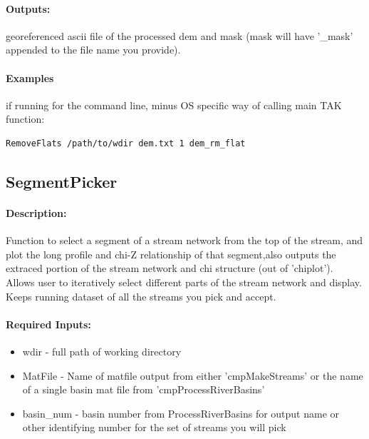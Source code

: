 \paragraph{Outputs:}
georeferenced ascii file of the processed dem and mask (mask will have '\_mask' appended to the
file name you provide).

\paragraph{Examples} if running for the command line, minus OS specific way of calling main TAK function:
\begin{lstlisting}[language=bash]
RemoveFlats /path/to/wdir dem.txt 1 dem_rm_flat
\end{lstlisting}

\subsection{SegmentPicker}
\paragraph{Description:}
Function to select a segment of a stream network from the top of the stream, and plot the long profile 
and chi-Z relationship of that segment,also outputs the extraced portion of the stream network and chi structure 
(out of 'chiplot'). Allows user to iteratively select different parts of the stream network and display. 
Keeps running dataset of all the streams you pick and accept.

\paragraph{Required Inputs:}
\begin{itemize}
\item wdir - full path of working directory
\item MatFile - Name of matfile output from either 'cmpMakeStreams' or the name of a single basin mat file from 'cmpProcessRiverBasins'
\item basin\_num - basin number from ProcessRiverBasins for output name or other identifying number for the set of streams you will pick
\end{itemize}

